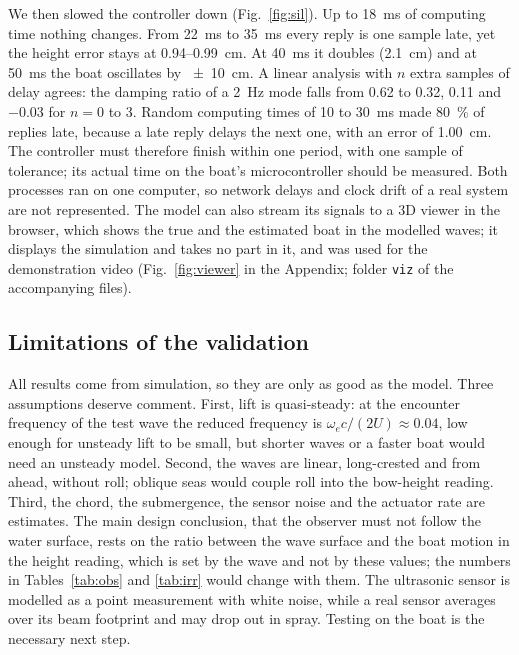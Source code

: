 \documentclass[conference]{IEEEtran}
\begin{document}
We then slowed the controller down (Fig.~\ref{fig:sil}). Up to \SI{18}{ms} of
computing time nothing changes. From \SI{22}{ms} to \SI{35}{ms} every reply is
one sample late, yet the height error stays at 0.94--\SI{0.99}{cm}. At
\SI{40}{ms} it doubles (\SI{2.1}{cm}) and at \SI{50}{ms} the boat oscillates by
\SI{\pm10}{cm}. A linear analysis with $n$ extra samples of delay agrees: the
damping ratio of a \SI{2}{Hz} mode falls from 0.62 to 0.32, 0.11 and $-0.03$
for $n=0$ to 3. Random computing times of 10 to \SI{30}{ms} made \SI{80}{\percent}
of replies late, because a late reply delays the next one, with an error of
\SI{1.00}{cm}. The controller must therefore finish within one period, with one
sample of tolerance; its actual time on the boat's microcontroller should be
measured. Both processes ran on one computer, so network delays and clock drift
of a real system are not represented. The model can also stream its signals to a
3D viewer in the browser, which shows the true and the estimated boat in the
modelled waves; it displays the simulation and takes no part in it, and was used
for the demonstration video (Fig.~\ref{fig:viewer} in the Appendix; folder
\texttt{viz} of the accompanying files).

\subsection{Limitations of the validation}

All results come from simulation, so they are only as good as the model. Three
assumptions deserve comment. First, lift is quasi-steady: at the encounter
frequency of the test wave the reduced frequency is
$\omega_e c/(2U)\approx0.04$, low enough for unsteady lift to be small, but
shorter waves or a faster boat would need an unsteady model. Second, the waves
are linear, long-crested and from ahead, without roll; oblique seas would couple
roll into the bow-height reading. Third, the chord, the submergence, the
sensor noise and the actuator rate are estimates. The main design conclusion,
that the observer must not follow the water surface, rests on the ratio
between the wave surface and the boat motion in the height reading, which is set
by the wave and not by these values; the numbers in Tables~\ref{tab:obs} and
\ref{tab:irr} would change with them. The ultrasonic sensor is modelled as a
point measurement with white noise, while a real sensor averages over its beam
footprint and may drop out in spray. Testing on the boat is the necessary next
step.
\end{document}
